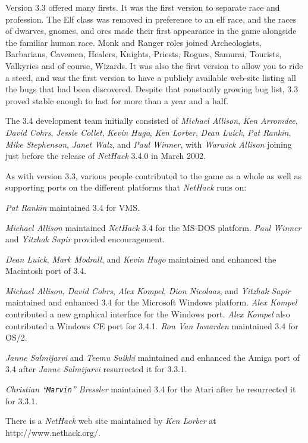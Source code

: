 Version 3.3 offered many firsts. It was the first version to separate race 
and profession. The Elf class was removed in preference to an elf race, 
and the races of dwarves, gnomes, and orcs made their first appearance in 
the game alongside the familiar human race.  Monk and Ranger roles joined 
Archeologists, Barbarians, Cavemen, Healers, Knights, Priests, Rogues, Samurai, 
Tourists, Valkyries and of course, Wizards.  It was also the first version
to allow you to ride a steed, and was the first version to have a publicly 
available web-site listing all the bugs that had been discovered.  Despite 
that constantly growing bug list, 3.3 proved stable enough to last for
more than a year and a half.

The 3.4 development team initially consisted of
{\it Michael Allison}, {\it Ken Arromdee},
{\it David Cohrs}, {\it Jessie Collet}, {\it Kevin Hugo}, {\it Ken Lorber},
{\it Dean Luick}, {\it Pat Rankin}, {\it Mike Stephenson}, 
{\it Janet Walz}, and {\it Paul Winner}, with {\it  Warwick Allison\/} joining 
just before the release of {\it NetHack\/} 3.4.0 in March 2002.

As with version 3.3, various people contributed to the game as a whole as
well as supporting ports on the different platforms that {\it NetHack\/} runs on:

{\it Pat Rankin\/} maintained 3.4 for VMS.

{\it Michael Allison\/} maintained {\it NetHack\/} 3.4 for the MS-DOS platform.  {\it Paul Winner\/}
and {\it Yitzhak Sapir\/} provided encouragement.

{\it Dean Luick}, {\it Mark Modrall}, and {\it Kevin Hugo\/} maintained and enhanced the
Macintosh port of 3.4.

{\it Michael Allison}, {\it David Cohrs}, {\it Alex Kompel}, {\it Dion Nicolaas}, and 
{\it Yitzhak Sapir\/} maintained and enhanced 3.4 for the Microsoft Windows platform.
{\it Alex Kompel\/} contributed a new graphical interface for the Windows port. 
{\it Alex Kompel\/} also contributed a Windows CE port for 3.4.1.
{\it Ron Van Iwaarden\/} maintained 3.4 for OS/2.

{\it Janne Salmijarvi\/} and {\it Teemu Suikki\/} maintained and 
enhanced the Amiga port of 3.4 after {\it Janne Salmijarvi\/} resurrected 
it for 3.3.1.

{\it Christian ``{\tt Marvin}'' Bressler\/} maintained 3.4 for the Atari after he 
resurrected it for 3.3.1.

There is a {\it NetHack\/} web site maintained by {\it Ken Lorber\/} at http://www.nethack.org/.

